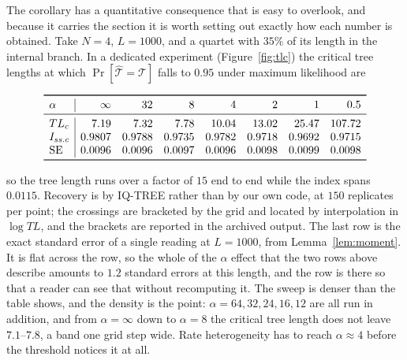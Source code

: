 \documentclass[preprint,12pt,authoryear]{elsarticle}
\newcommand{\Issc}{I_{ss.c}}
\theoremstyle{definition}
\theoremstyle{remark}
\begin{document}
\begin{sloppypar}
The corollary has a quantitative consequence that is easy to overlook, and
because it carries the section it is worth setting out exactly how each
number is obtained. Take $N=4$, $L=1000$, and a quartet with $35\%$ of its
length in the internal branch. In a dedicated experiment
(Figure~\ref{fig:tlc}) the critical tree lengths at which
$\Pr[\hat{\mathcal T}=\mathcal T]$ falls to $0.95$ under maximum likelihood
are

\begin{equation}
\begin{array}{l|rrrrrrr}
\toprule
\alpha & \infty & 32 & 8 & 4 & 2 & 1 & 0.5 \\
\midrule
TL_c      & 7.19 & 7.32 & 7.78 & 10.04 & 13.02 & 25.47 & 107.72 \\
\Issc     & 0.9807 & 0.9788 & 0.9735 & 0.9782 & 0.9718 & 0.9692 & 0.9715 \\
\mathrm{SE} & 0.0096 & 0.0096 & 0.0097 & 0.0096 & 0.0098 & 0.0099 & 0.0098 \\
\bottomrule
\end{array}
\label{eq:tlc}
\end{equation}

so the tree length runs over a factor of $15$ end to end while the index
spans $0.0115$. Recovery is by IQ-TREE rather than by our own code, at $150$
replicates per point; the crossings are bracketed by the grid and located by
interpolation in $\log TL$, and the brackets are reported in the archived
output. The last row is the exact standard error of a single reading at
$L=1000$, from Lemma~\ref{lem:moment}. It is flat across the row, so the
whole of the $\alpha$ effect that the two rows above describe amounts to
$1.2$ standard errors at this length, and the row is there so that a reader
can see that without recomputing it. The sweep is denser than the table shows, and the density is the
point: $\alpha=64,32,24,16,12$ are all run in addition, and from
$\alpha=\infty$ down to $\alpha=8$ the critical tree length does not leave
$7.1$--$7.8$, a band one grid step wide. Rate heterogeneity has to reach
$\alpha\approx4$ before the threshold notices it at all.


\end{sloppypar}
\end{document}
